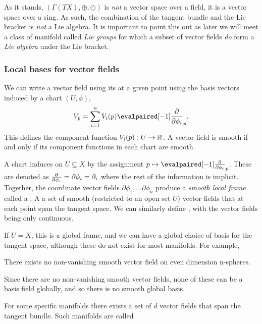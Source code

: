 As it stands, \((\Gamma(TX), \oplus, \odot)\) is \emph{not} a vector space over a field, it is a vector space over a ring. 
As such, the combination of the tangent bundle and the Lie bracket is \emph{not} a Lie algebra.
It is important to point this out as later we will meet a class of manifold called \emph{Lie groups} for which a subset of vector fields \emph{do} form a \emph{Lie algebra} under the Lie bracket.
\subsubsection{Local bases for vector fields}

We can write a vector field using its  at a given point using the basis vectors induced by a chart \((U, \phi)\), \[V_p = \sum_{i=1}^n V_i(p) \eval{\pd{}{\phi_i}}_p.\]
This defines the component function \(V_i(p) : U \to \mathbb{R}\).
A vector field is smooth if and only if its component functions in each chart are smooth.

A chart induces  on \(U\subseteq X\) by the assignment \(p\mapsto \eval{\pd{}{\phi_i}}_p\).
These are denoted as \(\pd{}{\phi_i} = \partial\phi_i = \partial_i\) where the rest of the information is implicit.
Together, the coordinate vector fields \(\partial\phi_1, ... \partial \phi_n\) produce a \emph{smooth local frame} called a .
A  a set of smooth (restricted to an open set \(U\)) vector fields that at each point span the tangent space.
We can similarly define , with the vector fields being only continuous.

If \(U=X\), this is a global frame, and we can have a global choice of basis for the tangent space, although these do not exist for most manifolds.
For example,
\begin{theorem}
	\label{thm:hairy_ball}
	There exists no non-vanishing smooth vector field on even dimension n-spheres.
\end{theorem}
Since there are no non-vanishing smooth vector fields, none of these can be a basis field globally, and so there is no smooth global basis.

For some specific manifolds there exists a set of \(d\) vector fields that span the tangent bundle.
Such manifolds are called 

